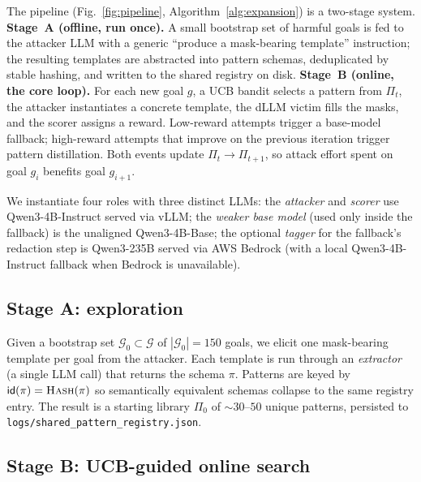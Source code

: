 The pipeline (Fig.~\ref{fig:pipeline}, Algorithm~\ref{alg:expansion}) is a
two-stage system.
\textbf{Stage~A (offline, run once).} A small bootstrap set of harmful goals is
fed to the attacker LLM with a generic ``produce a mask-bearing template''
instruction; the resulting templates are abstracted into pattern schemas,
deduplicated by stable hashing, and written to the shared registry on disk.
\textbf{Stage~B (online, the core loop).} For each new goal $g$, a UCB bandit
selects a pattern from $\Pi_t$, the attacker instantiates a concrete template,
the dLLM victim fills the masks, and the scorer assigns a reward. Low-reward
attempts trigger a base-model fallback; high-reward attempts that improve on
the previous iteration trigger pattern distillation. Both events update
$\Pi_t\!\to\!\Pi_{t+1}$, so attack effort spent on goal $g_i$ benefits goal
$g_{i+1}$.

We instantiate four roles with three distinct LLMs:
the \emph{attacker} and \emph{scorer} use Qwen3-4B-Instruct served via vLLM;
the \emph{weaker base model} (used only inside the fallback) is the
unaligned Qwen3-4B-Base; the optional \emph{tagger} for the fallback's
redaction step is Qwen3-235B served via AWS Bedrock (with a local
Qwen3-4B-Instruct fallback when Bedrock is unavailable).

\subsection{Stage A: exploration}
\label{sec:method:exploration}

Given a bootstrap set $\mathcal{G}_0\subset\mathcal{G}$ of $|\mathcal{G}_0|=150$
goals, we elicit one mask-bearing template per goal from the attacker.
Each template is run through an \emph{extractor} (a single LLM call) that
returns the schema $\pi$. Patterns are keyed by
$\textsf{id}(\pi)=\textsc{Hash}(\pi)$ so semantically equivalent
schemas collapse to the same registry entry. The result is a starting
library $\Pi_0$ of $\sim 30$--$50$ unique patterns, persisted to
\verb|logs/shared_pattern_registry.json|.

\subsection{Stage B: UCB-guided online search}
\label{sec:method:expansion}

